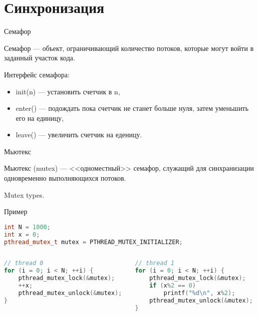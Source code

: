 \section{Синхронизация}

\begin{frame}{Семафор}

Семафор --- объект, ограничивающий количество потоков, которые могут войти в заданный участок кода.

Интерфейс семафора:

\begin{itemize}
    \item init(n) --- установить счетчик в n,
    \item enter() --- подождать пока счетчик не станет больше нуля, затем уменьшить его на единицу,
    \item leave() --- увеличить счетчик на еденицу.
\end{itemize}

\end{frame}

\begin{frame}{Мьютекс}

Мьютекс (\abbr mutex) --- <<одноместный>> семафор, служащий для синхранизации одновременно выполняющихся потоков.

\todo Mutex types.

\end{frame}

\begin{frame}[fragile]{Пример}

\begin{lstlisting}[language=C++,basicstyle=\ttfamily,keywordstyle=\color{blue},basicstyle=\scriptsize]
int N = 1000;
int x = 0;
pthread_mutex_t mutex = PTHREAD_MUTEX_INITIALIZER;
\end{lstlisting}

\begin{columns}[t]
    \begin{column}[T]{0.5\textwidth}
    \begin{lstlisting}[language=C++,basicstyle=\ttfamily,keywordstyle=\color{blue},basicstyle=\scriptsize]
// thread 0
for (i = 0; i < N; ++i) {
    pthread_mutex_lock(&mutex);
    ++x;
    pthread_mutex_unlock(&mutex);
}
    \end{lstlisting}
    \end{column}
    \begin{column}[T]{0.5\textwidth}
    \begin{lstlisting}[language=C++,basicstyle=\ttfamily,keywordstyle=\color{blue},basicstyle=\scriptsize]
// thread 1
for (i = 0; i < N; ++i) {
    pthread_mutex_lock(&mutex);
    if (x%2 == 0)
        printf("%d\n", x%2);
    pthread_mutex_unlock(&mutex);
}
    \end{lstlisting}
    \end{column}
\end{columns}

\end{frame}


